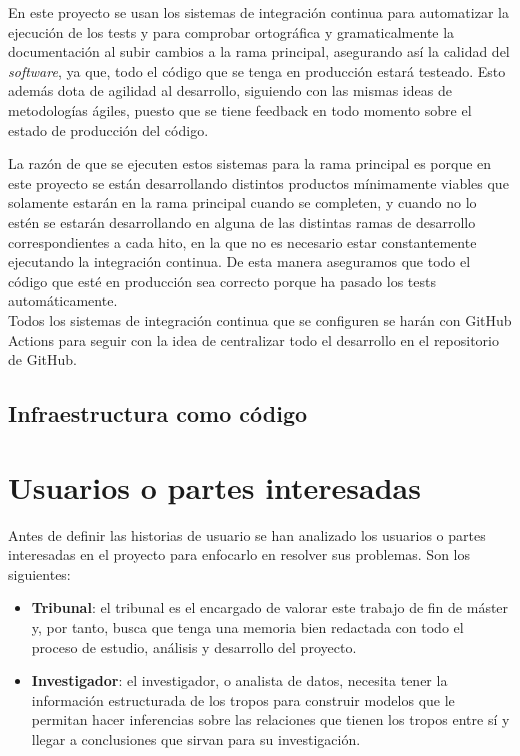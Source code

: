 En este proyecto se usan los sistemas de integración continua para automatizar
la ejecución de los tests y para comprobar ortográfica y gramaticalmente la
documentación al subir cambios a la rama principal, asegurando así la calidad
del \textit{software}, ya que, todo el código que se tenga en producción estará
testeado. Esto además dota de agilidad al desarrollo, siguiendo con las mismas
ideas de metodologías ágiles, puesto que se tiene feedback en todo momento sobre
el estado de producción del código.

La razón de que se ejecuten estos sistemas para la rama principal es porque en
este proyecto se están desarrollando distintos productos mínimamente viables que
solamente estarán en la rama principal cuando se completen, y cuando no lo estén
se estarán desarrollando en alguna de las distintas ramas de desarrollo
correspondientes a cada hito, en la que no es necesario estar constantemente
ejecutando la integración continua. De esta manera aseguramos que todo el código
que esté en producción sea correcto porque ha pasado los tests
automáticamente.\\

Todos los sistemas de integración continua que se configuren se harán con GitHub
Actions para seguir con la idea de centralizar todo el desarrollo en el
repositorio de GitHub.

\subsection{Infraestructura como código}

\section{Usuarios o partes interesadas}
Antes de definir las historias de usuario se han analizado los usuarios o partes
interesadas en el proyecto para enfocarlo en resolver sus problemas. Son los
siguientes:
\begin{itemize}
    \item \textbf{Tribunal}: el tribunal es el encargado de valorar este trabajo
    de fin de máster y, por tanto, busca que tenga una memoria bien redactada
    con todo el proceso de estudio, análisis y desarrollo del proyecto.
    \item \textbf{Investigador}: el investigador, o analista de datos, necesita
    tener la información estructurada de los tropos para construir modelos que
    le permitan hacer inferencias sobre las relaciones que tienen los tropos
    entre sí y llegar a conclusiones que sirvan para su investigación.
\end{itemize}

